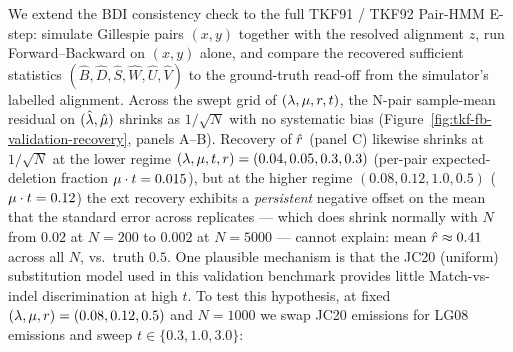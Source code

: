 
We extend the BDI consistency check to the full TKF91 / TKF92
Pair-HMM E-step: simulate Gillespie pairs $(x, y)$ together with
the resolved alignment $z$, run Forward--Backward on $(x, y)$
alone, and compare the recovered sufficient statistics
$(\hat B, \hat D, \hat S, \hat W, \hat U, \hat V)$ to the
ground-truth read-off from the simulator's labelled alignment.
Across the swept grid of $(\lambda, \mu, r, t)$, the
N-pair sample-mean residual on $(\hat{\lambda}, \hat{\mu})$
shrinks as $1/\sqrt{N}$ with no systematic bias
(Figure~\ref{fig:tkf-fb-validation-recovery}, panels A--B).
Recovery of $\hat{r}$ (panel C) likewise shrinks at $1/\sqrt{N}$
at the lower regime $(\lambda, \mu, t, r) = (0.04, 0.05,
0.3, 0.3)$ (per-pair expected-deletion fraction
$\mu \cdot t = 0.015$), but at the higher regime
$(0.08, 0.12, 1.0, 0.5)$ ($\mu \cdot t = 0.12$) the ext
recovery exhibits a \emph{persistent} negative offset on the mean
that the standard error across replicates --- which does shrink
normally with $N$ from $0.02$ at $N = 200$ to $0.002$ at $N =
5000$ --- cannot explain: mean $\hat{r} \approx 0.41$ across all
$N$, vs.\ truth $0.5$.  One plausible mechanism is that the JC20 (uniform)
substitution model used in this validation benchmark provides
little Match-vs-indel discrimination at high $t$.  To test this
hypothesis, at fixed
$(\lambda, \mu, r) = (0.08, 0.12, 0.5)$ and $N = 1000$ we
swap JC20 emissions for LG08 emissions and sweep $t \in \{0.3,
1.0, 3.0\}$:

